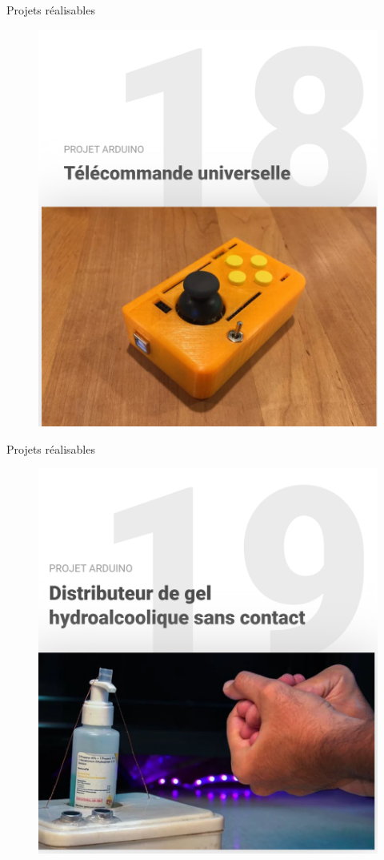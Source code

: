 \documentclass[]{beamer}
\begin{document}
	\begin{frame}
	{Projets réalisables}
			\begin{figure}
				\begin{center}
					\includegraphics[scale=0.4]{telecommande.png}
				\end{center}
			\end{figure}
	\end{frame}
	\begin{frame}
	{Projets réalisables}
			\begin{figure}
				\begin{center}
					\includegraphics[scale=0.4]{distributeur_gel.png}
				\end{center}
			\end{figure}
	\end{frame}
\end{document}
